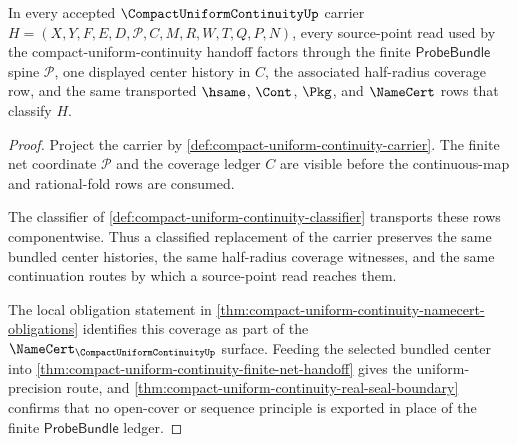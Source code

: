 \begin{theorem}
\label{thm:compact-uniform-continuity-probebundle-coverage}
In every accepted $\CompactUniformContinuityUp$ carrier
$H=(X,Y,F,E,D,\mathcal{P},C,M,R,W,T,Q,P,N)$, every source-point read used by the compact-uniform-continuity handoff factors through the finite $\mathsf{ProbeBundle}$ spine $\mathcal{P}$, one displayed center history in $C$, the associated half-radius coverage row, and the same transported $\hsame$, $\Cont$, $\Pkg$, and $\NameCert$ rows that classify $H$.
\end{theorem}
\begin{proof}
Project the carrier by \autoref{def:compact-uniform-continuity-carrier}. The finite net coordinate $\mathcal{P}$ and the coverage ledger $C$ are visible before the continuous-map and rational-fold rows are consumed.

The classifier of \autoref{def:compact-uniform-continuity-classifier} transports these rows componentwise. Thus a classified replacement of the carrier preserves the same bundled center histories, the same half-radius coverage witnesses, and the same continuation routes by which a source-point read reaches them.

The local obligation statement in \autoref{thm:compact-uniform-continuity-namecert-obligations} identifies this coverage as part of the $\NameCert_{\CompactUniformContinuityUp}$ surface. Feeding the selected bundled center into \autoref{thm:compact-uniform-continuity-finite-net-handoff} gives the uniform-precision route, and \autoref{thm:compact-uniform-continuity-real-seal-boundary} confirms that no open-cover or sequence principle is exported in place of the finite $\mathsf{ProbeBundle}$ ledger.
\end{proof}

